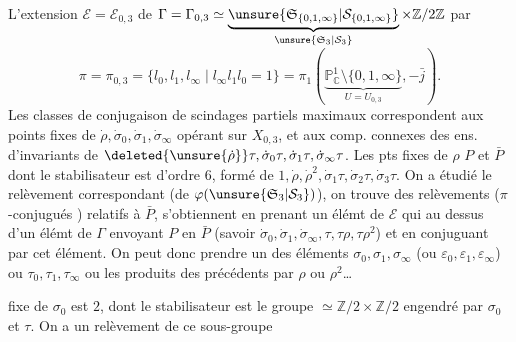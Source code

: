 L'extension $\mathcal E=\mathcal E_{0,3}$ de $\Gamma=\Gamma_{0,3}\simeq\underbrace{\unsure{\mathfrak S_{\{0,1,\infty\}}|\mathcal S_{\{0,1,\infty\}}}}_{\unsure{\mathfrak S_3|\mathcal S_3}}\times\mathbb Z/2\mathbb Z$
par
\[
\pi=\pi_{0,3}=\{l_0,l_1,l_\infty\mid l_\infty l_1l_0=1\}=\pi_1(\underbrace{\mathbb P^1_{\mathbb C}\setminus\{0,1,\infty\}}_{U=U_{0,3}},-\bar j).
\]
Les classes de conjugaison  de scindages partiels maximaux correspondent aux points fixes de $\dot\rho,\dot\sigma_0,\dot\sigma_1,\dot\sigma_\infty$ opérant sur $X_{0,3}$, et  aux comp. connexes des ens. d'invariants de $\deleted{\unsure{\dot\rho}}\tau,\dot\sigma_0\tau,\dot\sigma_1\tau,\dot\sigma_\infty\tau$. Les pts fixes de $\rho$  $P$ et $\bar P$ dont le stabilisateur est d'ordre $6$,  formé de $1,\dot\rho,\dot\rho^2,\dot\sigma_1\tau,\dot\sigma_2\tau,\dot\sigma_3\tau$. On a étudié le relèvement correspondant  (de $\varphi(\unsure{\mathfrak S_3|\mathcal S_3})$), on trouve des relèvements ($\pi$-conjugués ) relatifs à $\bar P$, s'obtiennent en  prenant un élémt de $\mathcal E$  qui  au dessus d'un élémt de $\Gamma$ envoyant $P$ en $\bar P$ (savoir $\dot\sigma_0,\dot\sigma_1,\dot\sigma_\infty,\tau,\tau\rho,\tau\rho^2$) et en conjuguant par cet élément. On peut donc prendre  un des éléments $\sigma_0,\sigma_1,\sigma_\infty$ (ou $\varepsilon_0,\varepsilon_1,\varepsilon_\infty$) ou $\tau_0,\tau_1,\tau_\infty$ ou les produits des précédents par \deleted{\unsure{$\tau$}} $\rho$ ou $\rho^2$\ldots

   fixe de $\sigma_0$ est $2$, dont le stabilisateur est le groupe $\simeq\mathbb Z/2\times\mathbb Z/2$ engendré par $\sigma_0$ et $\tau$. On a un relèvement de ce sous-groupe
